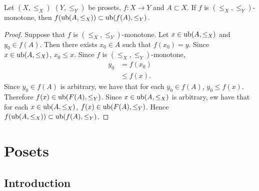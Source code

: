 \documentclass{book}
\begin{document}
	\begin{ex} 
		Let $(X, \leq_X)$ $(Y, \leq_Y)$ be prosets, $f:X \rightarrow Y$ and $A \subset X$. If $f$ is $(\leq_X, \leq_Y)$-monotone, then $f(\operatorname{ub} (A, \leq_X)) \subset \operatorname{ub}(f(A), \leq_Y)$.
	\end{ex}
	
	\begin{proof}
		Suppose that $f$ is $(\leq_X, \leq_Y)$-monotone. Let $x \in \operatorname{ub} (A, \leq_X)$ and $y_0 \in f(A)$. Then there exists $x_0 \in A$ such that $f(x_0) = y$. Since $x \in \operatorname{ub} (A, \leq_X)$, $x_0 \leq x$. Since $f$ is $(\leq_X, \leq_Y)$-monotone,  
		\begin{align*}
			y_0
			& = f(x_0) \\
			& \leq f(x).
		\end{align*}
		Since $y_0 \in f(A)$ is arbitrary, we have that for each $y_0 \in f(A)$, $y_0 \leq f(x)$. Therefore $f(x) \in \operatorname{ub}(F(A), \leq_Y)$. Since $x \in \operatorname{ub} (A, \leq_X)$ is arbitrary, ew have that for each $x \in \operatorname{ub} (A, \leq_X)$, $f(x) \in \operatorname{ub}(F(A), \leq_Y)$. Hence $f(\operatorname{ub} (A, \leq_X)) \subset \operatorname{ub}(f(A), \leq_Y)$.
	\end{proof}
	
	
	
	
	
	
	
	
	
	
	
	
	
	
	
	
	
	
	
	
	
	
	
	
	
	
	
	
	
	
	
	
	
	
	
	
	
	
	
	
	
	
	
	
	
	
	
	
	
	
	
	\newpage
	\section{Posets}
	
	\subsection{Introduction}
	
\end{document}
